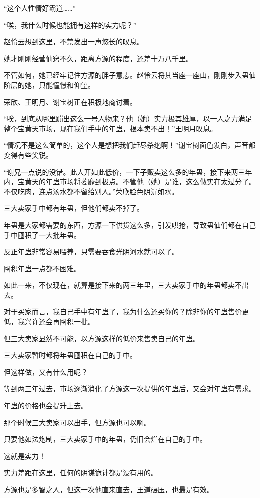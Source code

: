 \begin{this_body}
“这个人性情好霸道……”

“唉，我什么时候也能拥有这样的实力呢？”

赵怜云想到这里，不禁发出一声悠长的叹息。

她才刚刚经营仙窍不久，距离方源的程度，还差十万八千里。

不管如何，她已经牢记住方源的胖子意志。赵怜云将其当座一座山，刚刚步入蛊仙阶层的她，只能憧憬和仰望。

荣欣、王明月、谢宝树正在积极地商讨着。

“唉，到底从哪里蹦出这么一号人物来？他（她）实力极其雄厚，以一人之力满足整个宝黄天市场，现在我们手中的年蛊，根本卖不出！”王明月叹息。

“情况不是这么简单的，这个人是想把我们赶尽杀绝啊！”谢宝树面色发白，声音都变得有些尖锐。

“谢兄一点说的没错。此人开如此低价，一下子贩卖这么多的年蛊，接下来两三年内，宝黄天的年蛊市场将萎靡到极点。不管他（她）是谁，这么做实在太过分了。不仅吃肉，连点汤水都不留给别人。”荣欣脸色阴沉如水。

三大卖家手中都有年蛊，但他们都卖不掉了。

年蛊是大家都需要的东西，方源一下供货这么多，引发哄抢，导致蛊仙们都在自己手中囤积了一大批年蛊。

反正年蛊非常容易喂养，只需要吞食光阴河水就可以了。

囤积年蛊一点都不困难。

如此一来，不仅现在，就算是接下来的两三年里，三大卖家手中的年蛊都卖不出去。

对于买家而言，我自己手中有年蛊了，我为什么还买你的？除非你的年蛊售价更低，我兴许还会再囤积一批。

但三大卖家显然不可能，以方源这样的低价来售卖自己的年蛊。

三大卖家暂时都将年蛊囤积在自己的手中。

但这样做，又有什么用呢？

等到两三年过去，市场逐渐消化了方源这一次提供的年蛊后，又会对年蛊有需求。

年蛊的价格也会提升上去。

那个时候三大卖家可以出手，但方源也可以啊。

只要他如法炮制，三大卖家手中的年蛊，仍旧会烂在自己的手中。

这就是实力！

实力差距在这里，任何的阴谋诡计都是没有用的。

方源也是多智之人，但这一次他直来直去，王道碾压，也最是有效。


\end{this_body}

